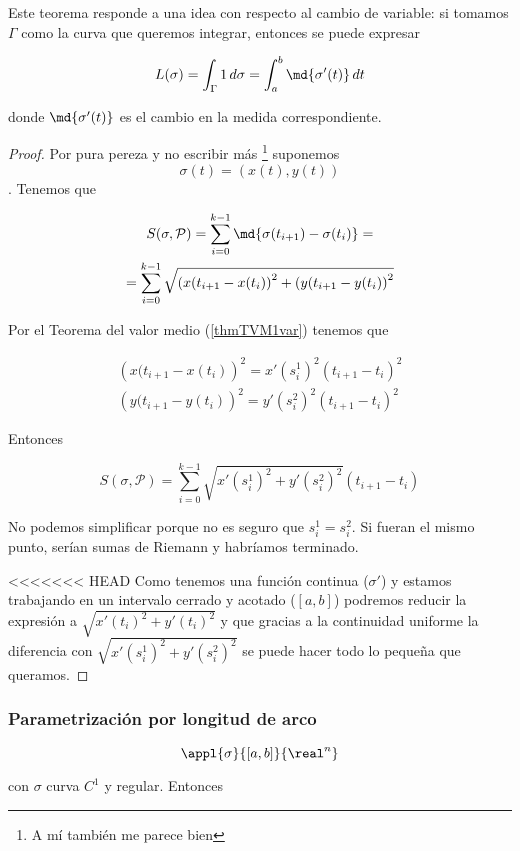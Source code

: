 Este teorema responde a una idea con respecto al cambio de variable: si tomamos $\Gamma$ como la curva que queremos integrar, entonces se puede expresar

\[ L(\sigma) = \int_\Gamma 1\,d\sigma = \int_a^b \md{\sigma'(t)}\,dt  \]

donde $\md{\sigma'(t)}$ es el cambio en la medida correspondiente.

\begin{proof} Por pura pereza y no escribir más \footnote{A mí también me parece bien} suponemos \[ \sigma(t) = (x(t),y(t)) \]. Tenemos que

\begin{gather*}
 S(\sigma,\mathcal{P}) = \sum_{i=0}^{k-1} \md{\sigma(t_{i+1}) - \sigma(t_i)} = \\
 = \sum_{i=0}^{k-1}\sqrt{\left(x(t_{i+1}-x(t_i)\right)^2 + \left(y(t_{i+1}-y(t_i)\right)^2}
 \end{gather*}
 
 Por el Teorema del valor medio (\ref{thmTVM1var}) tenemos que
 
 \begin{gather*}
 \left(x(t_{i+1}-x(t_i)\right)^2  = x'(s_i^1)^2(t_{i+1}-t_i)^2 \\
 \left(y(t_{i+1}-y(t_i)\right)^2  = y'(s_i^2)^2(t_{i+1}-t_i)^2
 \end{gather*}
 
 Entonces
 
 \[  S(\sigma,\mathcal{P})  = \sum_{i=0}^{k-1} \sqrt{x'(s_i^1)^2 + y'(s_i^2)^2} (t_{i+1}-t_i) \]
 
 No podemos simplificar porque no es seguro que $s_i^1 = s_i^2$. Si fueran el mismo punto, serían sumas de Riemann y habríamos terminado.
 
<<<<<<< HEAD
 Como tenemos una función continua ($\sigma'$) y estamos trabajando en un intervalo cerrado y acotado ($[a,b]$) podremos reducir la expresión a $\sqrt{x'(t_i)^2 + y'(t_i)^2}$ y que gracias a la continuidad uniforme la diferencia con $\sqrt{x'(s_i^1)^2 + y'(s_i^2)^2}$ se puede hacer todo lo pequeña que queramos.
  
\end{proof}

\subsubsection{Parametrización por longitud de arco}

\[ \appl{\sigma}{[a,b]}{\real^n} \]

con $\sigma$ curva $C^1$ y regular. Entonces

